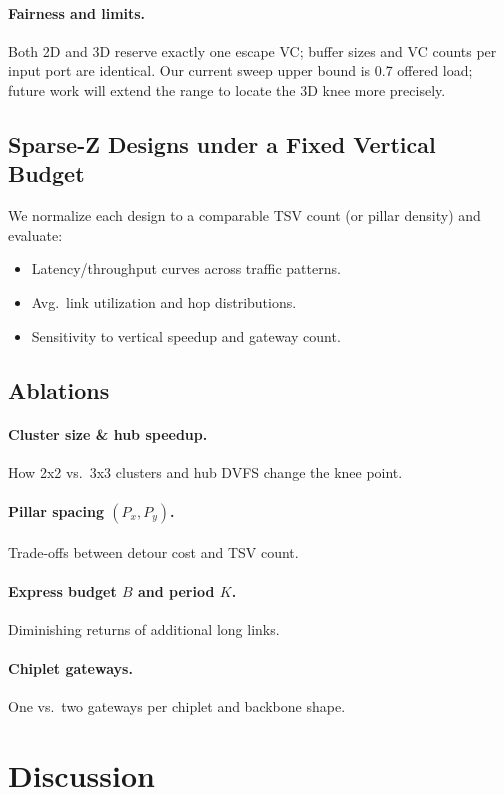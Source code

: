 \documentclass[11pt]{article}
\begin{document}
\paragraph{Fairness and limits.} Both 2D and 3D reserve exactly one escape VC; buffer sizes and VC counts per input port are identical. Our current sweep upper bound is 0.7 offered load; future work will extend the range to locate the 3D knee more precisely.

\subsection{Sparse-Z Designs under a Fixed Vertical Budget}
\label{sec:sparse-results}
We normalize each design to a comparable TSV count (or pillar density) and evaluate:
\begin{itemize}[leftmargin=1em]
  \item Latency/throughput curves across traffic patterns.
  \item Avg.\ link utilization and hop distributions.
  \item Sensitivity to vertical speedup and gateway count.
\end{itemize}


\subsection{Ablations}
\paragraph{Cluster size \& hub speedup.} How 2x2 vs.\ 3x3 clusters and hub DVFS change the knee point.
\paragraph{Pillar spacing $(P_x,P_y)$.} Trade-offs between detour cost and TSV count.
\paragraph{Express budget $B$ and period $K$.} Diminishing returns of additional long links.
\paragraph{Chiplet gateways.} One vs.\ two gateways per chiplet and backbone shape.

\section{Discussion}
\end{document}
